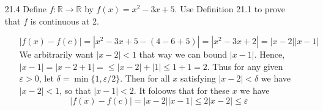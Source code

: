 \documentclass[12pt]{article}
\begin{document}
\begin{enumerate}
\item[21.4] Define $f: \mathbb{R} \rightarrow \mathbb{R}$ by $f(x) = x^2 - 3x + 5$. Use Definition 21.1 to prove that $f$ is continuous at 2.
\begin{enumerate}
\item[] 
\[ 
|f(x) - f(c)| = |x^2 - 3x + 5 - (4 - 6 + 5)| = |x^2 - 3x + 2| = |x - 2||x - 1|
\]
We arbitrarily want $|x - 2| < 1$ that way we can bound $|x - 1|$. Hence, 
$|x - 1| = |x - 2 + 1| = \leq |x - 2| + |1| \leq 1 + 1 = 2$. Thus for any given
$\varepsilon > 0$, let $\delta = \min \{1, \varepsilon /2 \}$. Then for all $x$
satisfying $|x - 2| < \delta$ we have $|x - 2| < 1$, so that $|x - 1| < 2$. It
foloows that for these $x$ we have 
\[
|f(x) - f(c)| = |x - 2||x - 1| \leq 2|x - 2| \leq \varepsilon
\]
\end{enumerate}


\end{enumerate}
\end{document}
